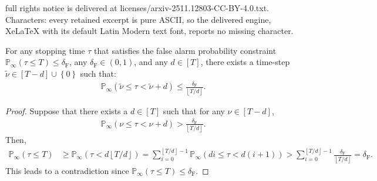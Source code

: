 \documentclass[10pt,a4paper]{amsart}
\newcommand{\lbp}{\left\{}
\newcommand{\lb}{\left[}
\newcommand{\lfl}{\left\lfloor}
\newcommand{\lp}{\left(}
\newcommand{\mrm}{\mathrm}
\newcommand{\rbp}{\right\}}
\newcommand{\rb}{\right]}
\newcommand{\rfl}{\right\rfloor}
\newcommand{\rp}{\right)}
\newcommand{\tilnu}{\tilde{\nu}}
\renewcommand{\Pr}{\mathbb{P}}
\begin{document}
full rights notice is delivered at licenses/arxiv-2511.12803-CC-BY-4.0.txt. Characters: every retained excerpt is pure ASCII, so the delivered engine, XeLaTeX with its default Latin Modern text font, reports no missing character.
\begin{lemma}\label{lem:LowBoundFA} For any stopping time $\tau$ that satisfies the false alarm probability constraint $\Pr_{\infty} \lp \tau \leq T \rp \leq \delta_{\mrm{F}}$, any $\delta_{\mathrm{F}}\in\lp0,1\rp$, and any $d\in\lb T\rb$, there exists a time-step $\tilnu\in\lb T-d\rb\cup\lbp 0\rbp$ such that:
%
\begin{align}
\Pr_{\infty}\lp\tilnu\leq\tau< \tilnu+d\rp\leq\frac{\delta_{\mathrm{F}}}{\lfl T/d\rfl}.\label{eq:FA_window}
\end{align}
%
\end{lemma}

\begin{proof}
Suppose that there exists a $d \in \lb T\rb$ such that for any $\nu\in\lb T-d\rb$,
%
\begin{align}
\Pr_{\infty}\lp\nu\leq\tau<\nu+d\rp>\frac{\delta_{\mathrm{F}}}{\lfl T/d\rfl}.
\end{align}
%
Then,
%
\begin{align}
\Pr_{\infty}\lp\tau\leq T\rp
&\geq\Pr_{\infty}\lp\tau< d\lfl T/d\rfl\rp
=\!\!\sum_{i=0}^{\lfl T/d\rfl-1}\!\!\Pr_{\infty}\lp d i\leq\tau
<d\lp i+1\rp\rp>\!\!\sum_{i=0}^{\lfl T/d \rfl-1}\!\!\frac{\delta_{\mathrm{F}}}{\lfl T/d \rfl}
=\delta_{\mathrm{F}}.
\end{align}
%
This leads to a contradiction since $\Pr_{\infty}\lp\tau\leq T\rp\leq\delta_{\mathrm{F}}$.
\end{proof}
\end{document}
